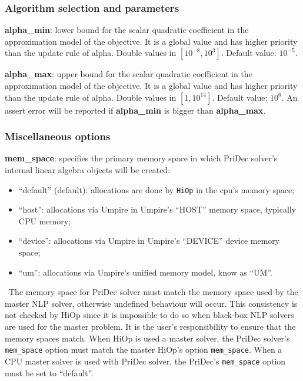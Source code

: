 \documentclass[11pt]{article}
\newcounter{line}
\newcommand{\warningSymbol}{\raisebox{0.9\depth}{\danger}}
\newcommand{\warningcp}[1]{%
        \smallskip \noindent \textcolor{warningColorText}{\warningSymbol{}}\,\textbf{#1} %
    }
\newcommand{\Hi}{\texttt{HiOp}\xspace}
\begin{document}
\subsubsection{Algorithm selection and parameters}
  \noindent \textbf{alpha\_min}: lower bound for the scalar quadratic coefficient in the approximation model of the objective. It is a global value and has higher priority than the update rule of alpha. Double values in $[10^{-8},10^3]$. Default value: $10^{-5}$.

  \medskip

  \noindent \textbf{alpha\_max}: upper bound for the scalar quadratic coefficient in the approximation model of the objective. It is a global value and has higher priority than the update rule of alpha. Double values in $[1,10^{14}]$. Default value: $10^6$. An assert error will be reported if \textbf{alpha\_min} is bigger than \textbf{alpha\_max}.
%

\subsubsection{Miscellaneous options}


\noindent \textbf{mem\_space}: specifies the primary memory space in which PriDec solver's internal linear algebra objects will be created:
\begin{itemize}
\item ``default'' (default): allocations are done by \Hi in the cpu's memory space;
\item ``host'':  allocations via Umpire in Umpire's ``HOST'' memory space, typically CPU memory;
\item ``device'': allocations via Umpire in Umpire's ``DEVICE'' device memory space;
\item ``um'': allocations via Umpire's unified memory model, know as ``UM''.
\end{itemize}
\warningcp{} The memory space for PriDec solver must match the memory space used by the master NLP solver, otherwise undefined behaviour will occur. This consistency is not checked by HiOp since it is impossible to do so when black-box NLP solvers are used for the master problem. It is the user's responsibility to ensure that the memory spaces match. When HiOp is used a master solver, the PriDec solver's \texttt{mem\_space} option must match the master HiOp's option \texttt{mem\_space}. When a CPU master solver is used with PriDec solver, the PriDec's \texttt{mem\_space} option must be set to ``default''.
\end{document}
